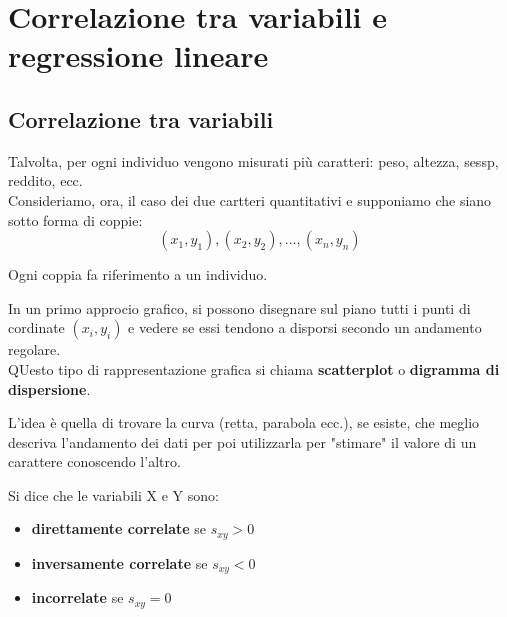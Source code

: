 
\chapter{Correlazione tra variabili e regressione lineare}

\section{Correlazione tra variabili}
Talvolta, per ogni individuo vengono misurati più caratteri: peso, altezza, sessp, reddito, ecc.\\[0.2ex]
Consideriamo, ora, il caso dei due cartteri quantitativi e supponiamo che siano sotto forma di coppie:
\begin{equation*}
(x_1,y_1), (x_2,y_2), \dots, (x_n,y_n)
\end{equation*}

Ogni coppia fa riferimento a un individuo.

\medskip
In un primo approcio grafico, si possono disegnare sul piano tutti i punti di cordinate $(x_i,y_i)$ e vedere se essi tendono a disporsi secondo un andamento regolare.\\[0.2ex]
QUesto tipo di rappresentazione grafica si chiama \textcolor{viola}{\textbf{scatterplot}} o \textcolor{viola}{\textbf{digramma di dispersione}}.


L'idea è quella di trovare la curva (retta, parabola ecc.), se esiste, che meglio descriva l'andamento dei dati per poi utilizzarla per "stimare" il valore di un carattere conoscendo l'altro.


Si dice che le variabili X e Y sono:
\begin{itemize}[label=$\triangleright$]
\item \textbf{direttamente correlate} se $s_{xy} > 0$
\smallskip
\item \textbf{inversamente correlate} se $s_{xy} < 0$
\smallskip
\item \textbf{incorrelate} se $s_{xy} = 0$
\end{itemize}

